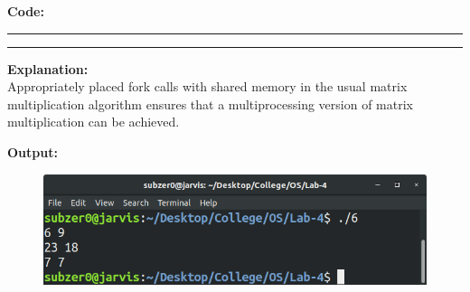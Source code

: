 \documentclass{article}
\begin{document}
\textbf{\Large Code:}
\smallskip
\par\noindent\rule{\textwidth}{0.4pt}

\par\noindent\rule{\textwidth}{0.4pt}

\bigskip
\noindent
\textbf{\Large Explanation: } \\

Appropriately placed fork calls with shared memory in the usual matrix multiplication algorithm 
ensures that a multiprocessing version of matrix multiplication can be achieved.

\bigskip
\noindent
\textbf{\Large Output:}

\begin{figure}[h]
	\includegraphics[width=\textwidth]{output/6.png}
\end{figure}
\bigskip
\bigskip
\bigskip

\bigskip
\end{document}
